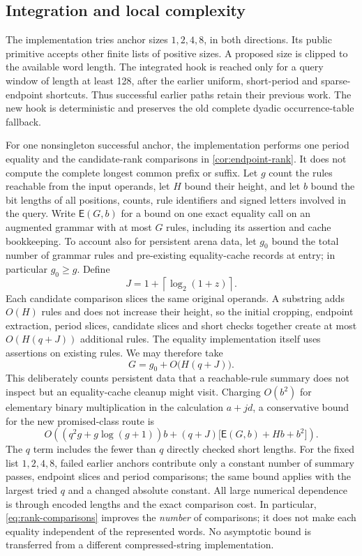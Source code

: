 \subsection{Integration and local complexity}

The implementation tries anchor sizes $1,2,4,8$, in both directions. Its
public primitive accepts other finite lists of positive sizes. A proposed
size is clipped to the available word length. The integrated hook is reached
only for a query window of length at least 128, after the earlier uniform,
short-period and sparse-endpoint shortcuts. Thus successful earlier paths
retain their previous work. The new hook is deterministic and preserves
the old complete dyadic occurrence-table fallback.

For one nonsingleton successful anchor, the implementation performs one
period equality and the candidate-rank comparisons in
\cref{cor:endpoint-rank}. It does not compute the complete longest common
prefix or suffix. Let $g$ count the rules reachable from the input operands,
let $H$ bound their height, and let $b$ bound the bit lengths of all
positions, counts, rule identifiers and signed letters involved in the
query. Write $\mathsf E(G,b)$ for a bound on one exact equality call on
an augmented grammar with at most $G$ rules, including its assertion and
cache bookkeeping. To account also for persistent arena data, let $g_0$
bound the total number of grammar rules and pre-existing equality-cache
records at entry; in particular $g_0\geq g$. Define
\[
 J=1+\left\lceil\log_2(1+z)\right\rceil.
\]
Each candidate comparison slices the same original operands. A substring
adds $O(H)$ rules and does not increase their height, so the initial
cropping, endpoint extraction, period slices, candidate slices and short
checks together create at most $O(H(q+J))$ additional rules. The equality
implementation itself uses assertions on existing rules. We may therefore
take
\[
 G=g_0+O\bigl(H(q+J)\bigr).
\]
This deliberately counts persistent data that a reachable-rule summary
does not inspect but an equality-cache cleanup might visit.
Charging $O(b^2)$ for elementary binary multiplication in the calculation
$a+jd$, a conservative bound for the new promised-class route is
\begin{equation}
 O\!\left((q^2g+g\log(g+1))b
 +(q+J)\bigl[\mathsf E(G,b)+Hb+b^2\bigr]\right).
 \label{eq:overlap-cost}
\end{equation}
The $q$ term includes the fewer than $q$ directly checked short lengths.
For the fixed list $1,2,4,8$, failed earlier anchors contribute only a
constant number of summary passes, endpoint slices and period comparisons;
the same bound applies with the largest tried $q$ and a changed absolute
constant. All large numerical dependence is through encoded lengths and
the exact comparison cost. In particular, \cref{eq:rank-comparisons}
improves the \emph{number} of comparisons; it does not make each equality
independent of the represented words. No asymptotic bound is transferred
from a different compressed-string implementation.


